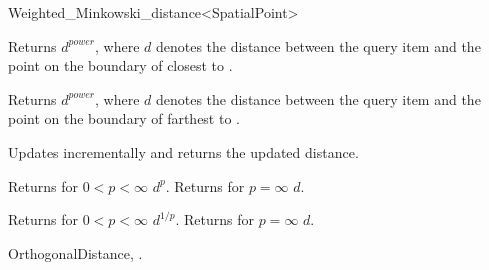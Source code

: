 \begin{ccRefClass}{Weighted_Minkowski_distance<SpatialPoint>}
\ccOperations



{Returns $d^{power}$, where $d$ denotes the distance between the query item  and
the point on the boundary of  closest to .}

{Returns $d^{power}$, where $d$ denotes the distance between the query item  and
the point on the boundary of  farthest to .}

 {Updates  incrementally
and returns the updated distance.}

 {Returns for $0 < p <\infty$ $d^p$. Returns for $p=\infty$ $d$.}

 {Returns for $0 < p <\infty$ $d^{1/p}$}.
{Returns for $p=\infty$ $d$.}
 

\ccSeeAlso

OrthogonalDistance,
.

\end{ccRefClass}


